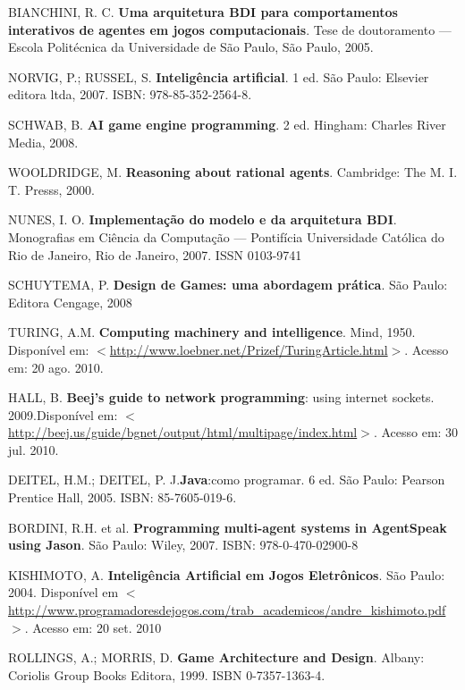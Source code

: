 \begin{thebibliography}{99}
    BIANCHINI, R. C. \textbf{Uma arquitetura BDI para comportamentos interativos de agentes em jogos computacionais}. Tese de doutoramento --- Escola Politécnica da Universidade de São Paulo, São Paulo, 2005.

    NORVIG, P.; RUSSEL, S. \textbf{Inteligência artificial}. 1 ed. São Paulo: Elsevier editora ltda, 2007. ISBN: 978-85-352-2564-8.

SCHWAB, B. \textbf{AI game engine programming}. 2 ed. Hingham: Charles River Media, 2008.

WOOLDRIDGE, M. \textbf{Reasoning about rational agents}. Cambridge: The M. I. T. Presss, 2000.


NUNES, I. O. \textbf{Implementação do modelo e da arquitetura BDI}. Monografias em Ciência da Computação --- Pontifícia Universidade Católica do Rio de Janeiro, Rio de Janeiro, 2007.
ISSN 0103-9741

SCHUYTEMA, P. \textbf{Design de Games: uma abordagem prática}. São Paulo: Editora Cengage, 2008

TURING, A.M. \textbf{Computing machinery and intelligence}. Mind, 1950. Disponível em: $<$\url{http://www.loebner.net/Prizef/TuringArticle.html}$>$. Acesso em: 20 ago. 2010.

HALL, B. \textbf{Beej’s guide to network programming}: using internet sockets. 2009.Disponível em: $<$\url{http://beej.us/guide/bgnet/output/html/multipage/index.html}$>$.
Acesso em: 30 jul. 2010.

DEITEL, H.M.; DEITEL, P. J.\textbf{Java}:como programar. 6 ed. São Paulo: Pearson Prentice Hall, 2005. ISBN: 85-7605-019-6.

BORDINI, R.H. et al. \textbf{Programming multi-agent systems in AgentSpeak using Jason}. São Paulo: Wiley, 2007. ISBN: 978-0-470-02900-8

KISHIMOTO, A. \textbf{Inteligência Artificial em Jogos Eletrônicos}. São Paulo: 2004. Disponível em $<$\url{http://www.programadoresdejogos.com/trab_academicos/andre_kishimoto.pdf}$>$.
Acesso em: 20 set. 2010


ROLLINGS, A.; MORRIS, D. \textbf{Game Architecture and Design}. Albany: Coriolis Group Books Editora, 1999. ISBN 0-7357-1363-4.


\end{thebibliography}
